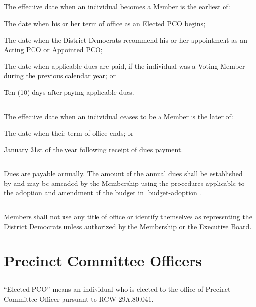 \subsection{}
The effective date when an individual becomes a Member is the earliest of:
\begin{alphalist}
    \item The date when his or her term of office as an Elected PCO begins;
    \item The date when the \fortythird{} District Democrats recommend his or her appointment as an Acting PCO or
Appointed PCO;
    \item The date when applicable dues are paid, if the individual was a Voting Member during the previous
calendar year; or
    \item Ten (10) days after paying applicable dues.
\end{alphalist}

\subsection{}
The effective date when an individual ceases to be a Member is the later of:
\begin{alphalist}
    \item The date when their term of office ends; or
    \item January 31st of the year following receipt of dues payment.
\end{alphalist}

\subsection{}
Dues are payable annually. The amount of the annual dues shall be established by and may be amended by the Membership using the procedures applicable to the adoption and amendment of the budget in \autoref{budget-adoption}.

\subsection{}
Members shall not use any title of office or identify themselves as representing the \fortythird{} District Democrats unless authorized by the Membership or the Executive Board.

\section{Precinct Committee Officers}
\subsection{} \label{elected-pco}
“Elected PCO” means an individual who is elected to the office of Precinct Committee Officer pursuant to RCW 29A.80.041.

